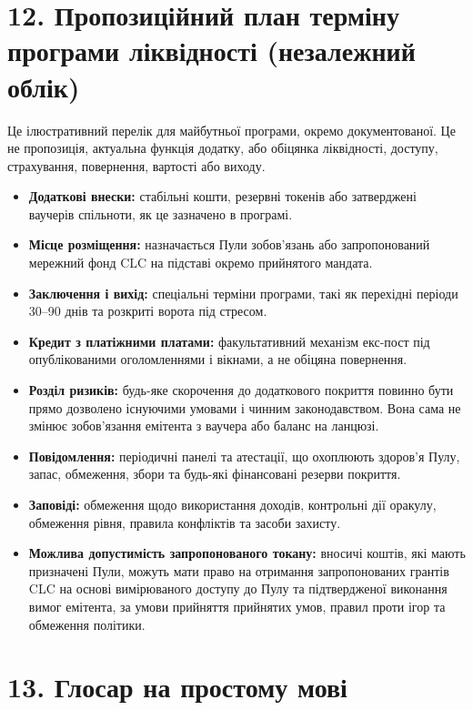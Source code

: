 \documentclass[11pt]{article}
\begin{document}
\section*{12. Пропозиційний план терміну програми ліквідності (незалежний облік)}

Це ілюстративний перелік для майбутньої програми, окремо документованої. Це не пропозиція, актуальна функція додатку, або обіцянка ліквідності, доступу, страхування, повернення, вартості або виходу.

\begin{itemize}[leftmargin=*]
\item \textbf{Додаткові внески:} стабільні кошти, резервні токенів або затверджені ваучерів спільноти, як це зазначено в програмі.
\item \textbf{Місце розміщення:} назначається Пули зобов'язань або запропонований мережний фонд CLC на підставі окремо прийнятого мандата.
\item \textbf{Заключення і вихід:} спеціальні терміни програми, такі як перехідні періоди 30--90 днів та розкриті ворота під стресом.
\item \textbf{Кредит з платіжними платами:} факультативний механізм екс-пост під опублікованими оголомленнями і вікнами, а не обіцяна повернення.
\item \textbf{Розділ ризиків:} будь-яке скорочення до додаткового покриття повинно бути прямо дозволено існуючими умовами і чинним законодавством. Вона сама не змінює зобов'язання емітента з ваучера або баланс на ланцюзі.
\item \textbf{Повідомлення:} періодичні панелі та атестації, що охоплюють здоров'я Пулу, запас, обмеження, збори та будь-які фінансовані резерви покриття.
\item \textbf{Заповіді:} обмеження щодо використання доходів, контрольні дії оракулу, обмеження рівня, правила конфліктів та засоби захисту.
\item \textbf{Можлива допустимість запропонованого токану:} вносичі коштів, які мають призначені Пули, можуть мати право на отримання запропонованих грантів CLC на основі вимірюваного доступу до Пулу та підтвердженої виконання вимог емітента, за умови прийняття прийнятих умов, правил проти ігор та обмеження політики.
\end{itemize}


\section*{13. Глосар на простому мові}
\end{document}

